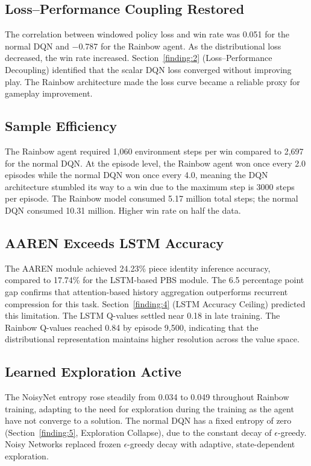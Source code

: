 \subsection{Loss--Performance Coupling Restored}\label{finding:9}
The correlation between windowed policy loss and win rate was 0.051 for the normal DQN and $-$0.787 for the Rainbow agent. As the distributional loss decreased, the win rate increased. Section~\ref{finding:2} (Loss--Performance Decoupling) identified that the scalar DQN loss converged without improving play. The Rainbow architecture made the loss curve became a reliable proxy for gameplay improvement.

\subsection{Sample Efficiency}\label{finding:10}
The Rainbow agent required 1,060 environment steps per win compared to 2,697 for the normal DQN. At the episode level, the Rainbow agent won once every 2.0 episodes while the normal DQN won once every 4.0, meaning the DQN architecture stumbled its way to a win due to the maximum step is 3000 steps per episode. The Rainbow model consumed 5.17 million total steps; the normal DQN consumed 10.31 million. Higher win rate on half the data.

\subsection{AAREN Exceeds LSTM Accuracy}\label{finding:11}
The AAREN module achieved 24.23\% piece identity inference accuracy, compared to 17.74\% for the LSTM-based PBS module. The 6.5 percentage point gap confirms that attention-based history aggregation outperforms recurrent compression for this task. Section~\ref{finding:4} (LSTM Accuracy Ceiling) predicted this limitation. The LSTM Q-values settled near 0.18 in late training. The Rainbow Q-values reached 0.84 by episode 9,500, indicating that the distributional representation maintains higher resolution across the value space.

\subsection{Learned Exploration Active}\label{finding:12}
The NoisyNet entropy rose steadily from 0.034 to 0.049 throughout Rainbow training, adapting to the need for exploration during the training as the agent have not converge to a solution. The normal DQN has a fixed entropy of zero (Section~\ref{finding:5}, Exploration Collapse), due to the constant decay of $\epsilon$-greedy. Noisy Networks replaced frozen $\epsilon$-greedy decay with adaptive, state-dependent exploration.

